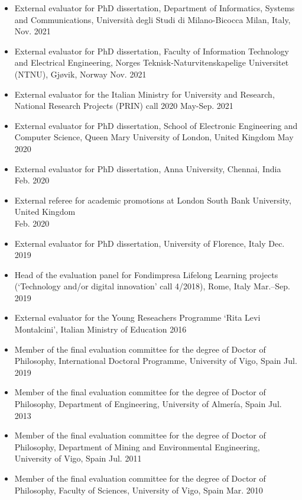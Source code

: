 \documentclass[11pt]{article}
\begin{document}
\begin{itemize}
    \item External evaluator for PhD dissertation, Department of Informatics, Systems and Communications, Università degli Studi di Milano-Bicocca Milan, Italy, \hfill Nov. 2021
    \item External evaluator for PhD dissertation, Faculty of Information Technology and Electrical Engineering, Norges Teknisk-Naturvitenskapelige Universitet (NTNU), Gjøvik, Norway \hfill Nov. 2021
    \item External evaluator for the Italian Ministry for University and Research, National Research Projects (PRIN) call 2020 \hfill May-Sep. 2021
    \item External evaluator for PhD dissertation, School of Electronic Engineering and Computer Science, Queen Mary University of London, United Kingdom \hfill May 2020
    \item External evaluator for PhD dissertation, Anna University, Chennai, India \hfill Feb. 2020
    \item External referee for academic promotions at London South Bank University, United Kingdom \\ \mbox{} \hfill Feb. 2020
    \item External evaluator for PhD dissertation, University of Florence, Italy \hfill Dec. 2019
    \item Head of the evaluation panel for Fondimpresa Lifelong Learning projects (`Technology and/or digital innovation' call 4/2018), Rome, Italy \hfill Mar.--Sep. 2019
    \item External evaluator for the Young Reseachers Programme ‘Rita Levi Montalcini’, Italian Ministry of Education \hfill 2016
    \item Member of the final evaluation committee for the degree of Doctor of Philosophy, International Doctoral Programme, University of Vigo, Spain \hfill Jul. 2019
    \item Member of the final evaluation committee for the degree of Doctor of Philosophy, Department of Engineering, University of Almería, Spain \hfill Jul. 2013
    \item Member of the final evaluation committee for the degree of Doctor of Philosophy, Department of Mining and Environmental Engineering, University of Vigo, Spain \hfill Jul. 2011
    \item Member of the final evaluation committee for the degree of Doctor of Philosophy, Faculty of Sciences, University of Vigo, Spain \hfill Mar. 2010 
\end{itemize}
\end{document}
